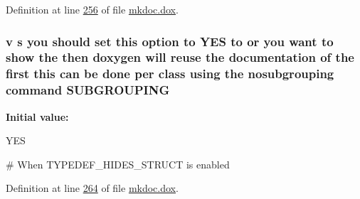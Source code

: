 Definition at line \hyperlink{mkdoc_8dox_source_l00256}{256} of file \hyperlink{mkdoc_8dox_source}{mkdoc.\-dox}.

\hypertarget{mkdoc_8dox_ae6985312f7898cf37a90edd149dbd7fc}{
\subsubsection[{S\-U\-B\-G\-R\-O\-U\-P\-I\-N\-G}]{\setlength{\rightskip}{0pt plus 5cm}v s you should set this option to Y\-E\-S to or you want to show the then doxygen will reuse the documentation of the first this can be done per class using the nosubgrouping command S\-U\-B\-G\-R\-O\-U\-P\-I\-N\-G}}\label{mkdoc_8dox_ae6985312f7898cf37a90edd149dbd7fc}
{\bfseries Initial value\-:}
\begin{DoxyCode}
 YES

\textcolor{preprocessor}{# When TYPEDEF\_HIDES\_STRUCT is enabled}
\end{DoxyCode}


Definition at line \hyperlink{mkdoc_8dox_source_l00264}{264} of file \hyperlink{mkdoc_8dox_source}{mkdoc.\-dox}.

